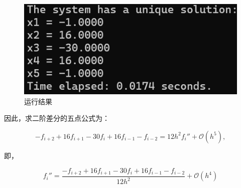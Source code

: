 \begin{figure}[H]
    \centering
    \includegraphics[width=1.0\textwidth]{Problem_1/figs/coeff.png}
    \caption{运行结果}
\end{figure}
因此，求二阶差分的五点公式为：

\[
- f_{i+2} + 16 f_{i+1} - 30 f_i + 16 f_{i-1} - f_{i-2} = 12 h^2 f_i'' + \mathcal{O}(h^5),
\]

即，

\[
\boxed{ f_i'' = \frac{ -f_{i+2} + 16 f_{i+1} - 30 f_i + 16 f_{i-1} - f_{i-2} }{12 h^2} + \mathcal{O}(h^4) }
\]



